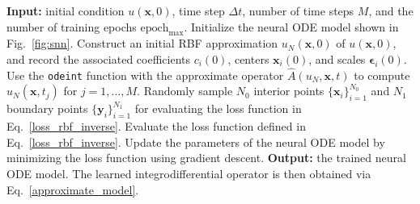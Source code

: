 \begin{algorithm}
\footnotesize
\caption{\footnotesize Pseudocode of the adaptive RBF approach for solving the inverse problem of inferring an integrodifferential operator in a multidimensional spatiotemporal equation from observed data.}
\begin{algorithmic}
  \STATE \textbf{Input:} initial condition $u(\bm{x},0)$, time step $\Delta t$, number of time steps $M$, and the number of training epochs $\text{epoch}_{\max}$.
  \STATE Initialize the neural ODE model shown in Fig.~\ref{fig:snn}.
  \STATE Construct an initial RBF approximation $u_N(\bm{x},0)$ of $u(\bm{x},0)$, and record the associated coefficients $c_i(0)$, centers $\bm{x}_i(0)$, and scales $\bm{\epsilon}_i(0)$.
    \STATE Use the \texttt{odeint} function with the approximate operator $\hat{A}(u_N,\bm{x},t)$ to compute $u_N(\bm{x},t_j)$ for $j = 1,\ldots,M$.
    \STATE Randomly sample $N_0$ interior points $\{\bm{x}_i\}_{i=1}^{N_0}$ and $N_1$ boundary points $\{\bm{y}_i\}_{i=1}^{N_1}$ for evaluating the loss function in Eq.~\eqref{loss_rbf_inverse}.
    \STATE Evaluate the loss function defined in Eq.~\eqref{loss_rbf_inverse}.
    \STATE Update the parameters of the neural ODE model by minimizing the loss function using gradient descent.
  \ENDFOR
  \STATE \textbf{Output:} the trained neural ODE model. The learned integrodifferential operator is then obtained via Eq.~\eqref{approximate_model}.
\end{algorithmic}
\label{algorithm_2}
\end{algorithm}



